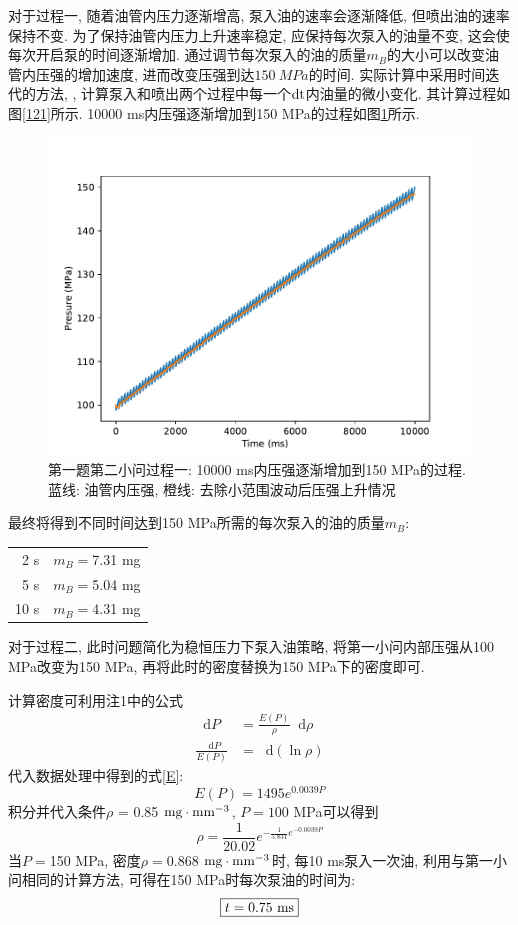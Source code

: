 \documentclass{cumcmthesis}
\renewcommand\d{\mathop{}\!\mathrm{d}}
\newcommand{\f}[2]{\frac{#1}{#2}}
\newcommand{\ar}[1]{
        \begin{aligned}                              %
            #1
        \end{aligned}   }
\newcommand{\x}{&=}
\begin{document}
对于过程一, 随着油管内压力逐渐增高, 泵入油的速率会逐渐降低, 但喷出油的速率保持不变. 为了保持油管内压力上升速率稳定, 应保持每次泵入的油量不变, 这会使每次开启泵的时间逐渐增加. 通过调节每次泵入的油的质量$m_B$的大小可以改变油管内压强的增加速度, 进而改变压强到达$150\ MPa$的时间. 实际计算中采用时间迭代的方法, , 计算泵入和喷出两个过程中每一个$\rm{d}t$内油量的微小变化. 其计算过程如图\ref{121}所示. 10000 ms内压强逐渐增加到150 MPa的过程如图\ref{12}所示.
\begin{figure}[htbp]
	\centering
	\includegraphics[width=.6\textwidth]{10000.pdf}
    \caption{第一题第二小问过程一: 10000 ms内压强逐渐增加到150 MPa的过程. 蓝线: 油管内压强, 橙线: 去除小范围波动后压强上升情况}
    \label{12}
\end{figure}

最终将得到不同时间达到150 MPa所需的每次泵入的油的质量$m_B$: 
\begin{center}
\begin{tabular}{|r|l|}
    \hline
    2 s & $m_B=$7.31 mg\\ 
    5 s & $m_B=$5.04 mg\\
    10 s & $m_B=$4.31 mg\\
    \hline
\end{tabular}
\end{center}



对于过程二, 此时问题简化为稳恒压力下泵入油策略, 将第一小问内部压强从100 MPa改变为150 MPa, 再将此时的密度替换为150 MPa下的密度即可. 

计算密度可利用注1中的公式
$$\ar{
    \d P \x \frac{E(P)}{\rho}\d \rho\\
    \f{\d P}{E(P)} \x \d(\ln\rho)
}$$
代入数据处理中得到的式\ref{E}:
$$E(P) = 1495e^{0.0039P}$$
积分并代入条件$\rho$ = 0.85 $\textup{mg}\cdot\rm{mm}^{-3}$, $ P = 100$ MPa可以得到
\begin{equation}
\rho = \f{1}{20.02}e^{-\f{1}{5.831}e^{-0.0039P}}  \label{rho}
\end{equation}
当$P =$150 MPa, 密度$\rho =$0.868 $\textup{mg}\cdot\rm{mm}^{-3}$时, 
每10 ms泵入一次油, 利用与第一小问相同的计算方法, 可得在150 MPa时每次泵油的时间为: 
$$\boxed{t = 0.75\ \rm{ms}}$$
\end{document}
